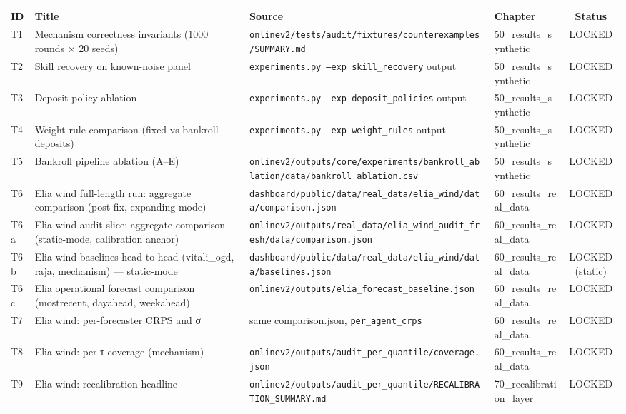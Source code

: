 \documentclass[11pt,a4paper,openany]{report}
\begin{document}
\begin{center}
\small
\begin{tabular}{llllc}
\toprule
\textbf{ID} & \textbf{Title} & \textbf{Source} & \textbf{Chapter} & \textbf{Status} \\
\midrule
T1 & Mechanism correctness invariants (1000 rounds × 20 seeds) & \texttt{onlinev2/tests/audit/fixtures/counterexamples/SUMMARY.md} & 50\_results\_synthetic & LOCKED \\
T2 & Skill recovery on known-noise panel & \texttt{experiments.py --exp skill\_recovery} output & 50\_results\_synthetic & LOCKED \\
T3 & Deposit policy ablation & \texttt{experiments.py --exp deposit\_policies} output & 50\_results\_synthetic & LOCKED \\
T4 & Weight rule comparison (fixed vs bankroll deposits) & \texttt{experiments.py --exp weight\_rules} output & 50\_results\_synthetic & LOCKED \\
T5 & Bankroll pipeline ablation (A–E) & \texttt{onlinev2/outputs/core/experiments/bankroll\_ablation/data/bankroll\_ablation.csv} & 50\_results\_synthetic & LOCKED \\
T6 & Elia wind full-length run: aggregate comparison (post-fix, expanding-mode) & \texttt{dashboard/public/data/real\_data/elia\_wind/data/comparison.json} & 60\_results\_real\_data & LOCKED \\
T6a & Elia wind audit slice: aggregate comparison (static-mode, calibration anchor) & \texttt{onlinev2/outputs/real\_data/elia\_wind\_audit\_fresh/data/comparison.json} & 60\_results\_real\_data & LOCKED \\
T6b & Elia wind baselines head-to-head (vitali\_ogd, raja, mechanism) — static-mode & \texttt{dashboard/public/data/real\_data/elia\_wind/data/baselines.json} & 60\_results\_real\_data & LOCKED (static) \\
T6c & Elia operational forecast comparison (mostrecent, dayahead, weekahead) & \texttt{onlinev2/outputs/elia\_forecast\_baseline.json} & 60\_results\_real\_data & LOCKED \\
T7 & Elia wind: per-forecaster CRPS and σ & same comparison.json, \texttt{per\_agent\_crps} & 60\_results\_real\_data & LOCKED \\
T8 & Elia wind: per-τ coverage (mechanism) & \texttt{onlinev2/outputs/audit\_per\_quantile/coverage.json} & 60\_results\_real\_data & LOCKED \\
T9 & Elia wind: recalibration headline & \texttt{onlinev2/outputs/audit\_per\_quantile/RECALIBRATION\_SUMMARY.md} & 70\_recalibration\_layer & LOCKED \\

\end{tabular}
\end{center}
\end{document}
